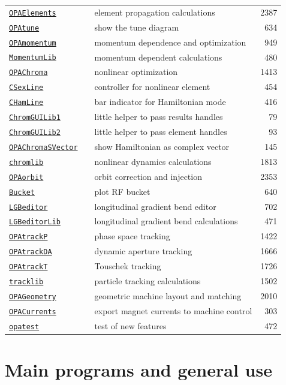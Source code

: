 \documentclass[12pt]{article}
\newcommand\code[1]{{\tt #1}}
\newcommand\guico[1]{{\color{blue}\code{#1}}}
\newcommand{\opagui}[1]{\colorbox{blue!20}{\code{#1}}}
\newcommand{\ogui}[1]{\hyperref[#1]{\opagui{#1}}}
\newcommand{\opaguif}[1]{\colorbox{violet!30}{\code{#1}}}
\newcommand{\oguif}[1]{\hyperref[#1]{\opaguif{#1}}}
\newcommand{\opauni}[1]{\colorbox{orange!30}{\code{#1}}}
\newcommand{\ouni}[1]{\hyperref[#1]{\opauni{#1}}}
\begin{document}
\begin{table}
{\begin{tabular}{lllr}
\ouni{OPAElements} & & element propagation calculations & 2387 \\
\ogui{OPAtune} & \guico{} & show the tune diagram & 634 \\
\hline
\ogui{OPAmomentum} & \guico{} & momentum dependence and optimization & 949 \\
\ouni{MomentumLib} & \guico{} & momentum dependent calculations & 480 \\
\hline
\ogui{OPAChroma} & \guico{} & nonlinear optimization & 1413 \\
\oguif{CSexLine} & \guico{} & controller for nonlinear element & 454 \\
\oguif{CHamLine} & \guico{} & bar indicator for Hamiltonian mode & 416 \\
\ouni{ChromGUILib1} & & little helper to pass results handles & 79 \\
\ouni{ChromGUILib2} & & little helper to pass element handles & 93 \\
\ogui{OPAChromaSVector} & \guico{} & show Hamiltonian as complex vector & 145 \\
\ouni{chromlib} & & nonlinear dynamics calculations & 1813 \\
\hline
\ogui{OPAorbit} & \guico{} & orbit correction and injection & 2353 \\
\hline
\ogui{Bucket} & \guico{} & plot RF bucket & 640 \\
\ogui{LGBeditor} & \guico{} & longitudinal gradient bend editor & 702 \\
\ouni{LGBeditorLib} & & longitudinal gradient bend calculations & 471 \\
\hline
\ogui{OPAtrackP} & \guico{} & phase space tracking & 1422 \\
\ogui{OPAtrackDA} & \guico{} & dynamic aperture tracking & 1666 \\
\ogui{OPAtrackT} & \guico{} & Touschek tracking & 1726 \\
\ouni{tracklib} & & particle tracking calculations & 1502 \\
\hline
\ogui{OPAGeometry} & \guico{} & geometric machine layout and matching & 2010 \\
\ogui{OPACurrents} & \guico{} & export magnet currents to machine control & 303 \\
\ouni{opatest} & & test of new features & 472 
\end{tabular}
}
\end{table}

\pagebreak

\section{\label{secglob}Main programs and general use}
\end{document}
